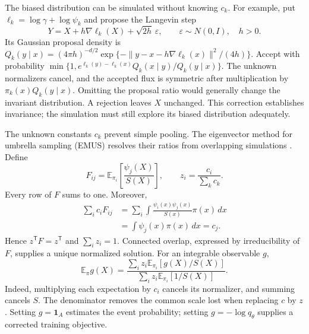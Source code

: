 The biased distribution can be simulated without knowing $c_k$. For example,
put $\ell_k=\log\gamma+\log\psi_k$ and propose the Langevin step
\begin{equation}
 Y=X+h\nabla\ell_k(X)+\sqrt{2h}\,\varepsilon,
 \qquad \varepsilon\sim N(0,I),\quad h>0.
 \label{eq:rare-window-mala}
\end{equation}
Its Gaussian proposal density is
$Q_k(y\mid x)=(4\pi h)^{-d/2}
\exp\{-\|y-x-h\nabla\ell_k(x)\|^2/(4h)\}$.
Accept with probability
$\min\{1,e^{\ell_k(y)-\ell_k(x)}Q_k(x\mid y)/Q_k(y\mid x)\}$.
The unknown normalizers cancel, and the accepted flux is symmetric after
multiplication by $\pi_k(x)Q_k(y\mid x)$. Omitting the proposal ratio would
generally change the invariant distribution. A rejection leaves $X$
unchanged. This correction establishes invariance; the simulation must still
explore its biased distribution adequately.

The unknown constants $c_k$ prevent simple pooling. The eigenvector method
for umbrella sampling (EMUS) resolves their ratios from overlapping simulations
\citep[sections II--IV]{thiede2016emus}. Define
\begin{equation}
 F_{ij}=\mathbb E_{\pi_i}\!\left[\frac{\psi_j(X)}{S(X)}\right],
 \qquad z_i=\frac{c_i}{\sum_k c_k}.
 \label{eq:rare-emus-overlap}
\end{equation}
Every row of $F$ sums to one. Moreover,
\begin{align}
 \sum_i c_iF_{ij}
 &=\sum_i\int\frac{\psi_i(x)\psi_j(x)}{S(x)}\pi(x)\,dx\\
 &=\int\psi_j(x)\pi(x)\,dx=c_j.
\end{align}
Hence $z^\mathsf TF=z^\mathsf T$ and $\sum_i z_i=1$. Connected overlap,
expressed by irreducibility of $F$, supplies a unique normalized solution.
For an integrable observable $g$,
\begin{equation}
 \mathbb E_\pi g(X)=
 \frac{\sum_i z_i\mathbb E_{\pi_i}[g(X)/S(X)]}
      {\sum_i z_i\mathbb E_{\pi_i}[1/S(X)]}.
 \label{eq:rare-emus-average}
\end{equation}
Indeed, multiplying each expectation by $c_i$ cancels its normalizer, and
summing cancels $S$. The denominator removes the common scale lost when
replacing $c$ by $z$. Setting $g=\mathbf1_A$ estimates the event probability;
setting $g=-\log q_\theta$ supplies a corrected training objective.

